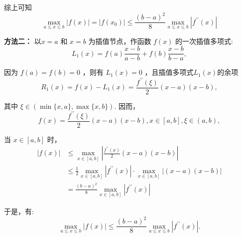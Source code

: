 \begin{tcolorbox}
综上可知 $$ \max _{a \leq x \leq b}|f(x)|=|f(x_0)| \leq \frac{(b-a)^{2}}{8} \max _{a \leq x \leq b}\left|f^{\prime \prime}(x)\right| $$

\textbf{方法二：}
以$ x=a $ 和 $ x=b $ 为插值节点，作函数 $ f(x) $ 的一次插值多项式:
$$
L_{1}(x)=f(a) \frac{x-b}{a-b}+f(b) \frac{x-b}{b-a},
$$

因为 $ f(a)=f(b)=0 $ ，则有 $ L_{1}(x)=0 $ ，且插值多项式$L_{1}(x)$的余项
$$
R_1(x)=f(x)-L_{1}(x)=\frac{f^{\prime \prime}(\xi)}{2}(x-a)(x-b),
$$

其中 $ \xi \in(\min \{x, a\}, \max \{x, b\}) $. 因而，
$$
f(x)=\frac{f^{\prime \prime}(\xi)}{2}(x-a)(x-b), x \in[a, b], \xi \in(a, b),
$$

当 $ x \in[a, b] $ 时，
$$
\begin{aligned}
|f(x)| &\leq \max_{x\in[a,b]} \left|\frac{f^{\prime \prime}(x)}{2}(x-a)(x-b)\right| \\
&\leq \frac{1}{2} \max _{x \in[a, b]}\left|f^{\prime \prime}(x)\right| \cdot \max _{x \in[a, b]}|(x-a)(x-b)| \\
&=\frac{(b-a)^{2}}{8} \max _{x \in[a, b]}\left|f^{\prime \prime}(x)\right|
\end{aligned}
$$

于是，有:
$$
\max _{a \leqslant x \leqslant b}|f(x)| \leqslant \frac{(b-a)^{2}}{8} \max _{a \leqslant x \leqslant b}\left|f^{\prime \prime}(x)\right| .
$$
\end{tcolorbox}



